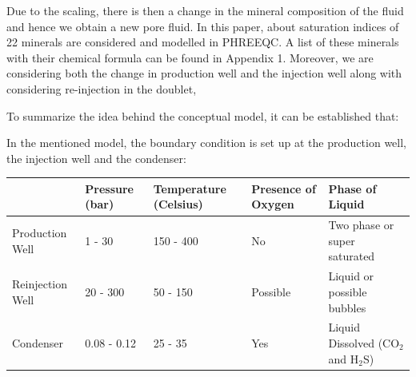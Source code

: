 Due to the scaling, there is then a change in the mineral composition of the fluid and hence we obtain a new pore fluid. In this paper, about saturation indices of 22 minerals are considered and modelled in PHREEQC. A list of these minerals with their chemical formula can be found in Appendix 1. Moreover, we are considering both the change in production well and the injection well along with considering re-injection in the doublet, 

To summarize the idea behind the conceptual model, it can be established that: 

In the mentioned model, the boundary condition is set up at the production well, the injection well and the condenser: 
\begin{table}[h!]
\centering
\begin{tabular}{|l|l|l|l|l|}
\hline
                 & Pressure (bar) & Temperature (Celsius) & Presence of Oxygen & Phase of Liquid                \\ \hline
Production Well  & 1 - 30        & 150 - 400             & No                 & Two phase or super saturated   \\ \hline
Reinjection Well &  20 - 300       & 50 - 150              & Possible           & Liquid or possible bubbles     \\ \hline
Condenser        & 0.08 - 0.12    & 25 - 35               & Yes                & Liquid Dissolved (CO$_2$ and H$_2$S) \\ \hline
\end{tabular}
\end{table}